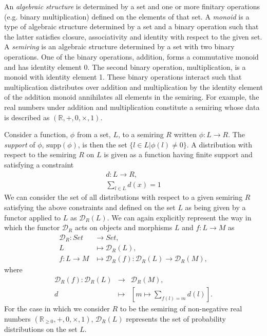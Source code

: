 \documentclass[10pt]{article}
\begin{document}
An \emph{algebraic structure} is determined by a set and one or more finitary operations (e.g. binary multiplication) defined on the elements of that set. A \emph{monoid} is a type of algebraic structure determined by a set and a binary operation such that the latter satisfies closure, associativity and identity with respect to the given set. A \emph{semiring} is an algebraic structure determined by a set with two binary operations. One of the binary operations, addition, forms a commutative monoid and has identity element 0. The second binary operation, multiplication, is a monoid with identity element 1. These binary operations interact such that multiplication distributes over addition and multiplication by the identity element of the addition monoid annihilates all elements in the semiring. For example, the real numbers under addition and multiplication constitute a semiring whose data is described as $\left( \mathbb{R},+,0,\times,1 \right)$.

Consider a function, $\phi$ from a set, $L$, to a semiring $R$ written $\phi \colon L \rightarrow R$. The \emph{support} of $\phi$, $\text{supp}(\phi)$, is then the set $\{ l \in L | \phi(l) \neq 0 \}$. A distribution with respect to the semiring $R$ on $L$ is given as a function having finite support and satisfying a constraint
\begin{eqnarray*}
d \colon L \rightarrow R,\\
\sum_{l \in L} d(x) = 1
\end{eqnarray*}
We can consider the set of all distributions with respect to a given semiring $R$ satisfying the above constraints and defined on the set $L$ as being given by a functor applied to $L$ as $\mathcal{D}_R (L)$. We can again explicitly represent the way in which the functor $\mathcal{D}_R$ acts on objects and morphisms $L$ and $f \colon L \rightarrow M$ as
\begin{equation}\label{eq:distfunctor}
\begin{split}
\mathcal{D}_R \colon Set &\rightarrow Set,\\
L &\mapsto \mathcal{D}_R (L),\\
f \colon L \rightarrow M &\mapsto \mathcal{D}_R (f) \colon \mathcal{D}_R (L) \rightarrow \mathcal{D}_R (M),
\end{split}
\end{equation}
where
\begin{eqnarray*}
\mathcal{D}_R (f) \colon \mathcal{D}_R (L) &\rightarrow& \mathcal{D}_R (M),\\
d &\mapsto& \left[ m \mapsto \sum_{f(l)=m} d(l) \right]. 
\end{eqnarray*}
For the case in which we consider $R$ to be the semiring of non-negative real numbers $\left( \mathbb{R}_{\geq 0},+,0,\times,1 \right)$, $\mathcal{D}_R (L)$ represents the set of probability distributions on the set $L$.
\end{document}
